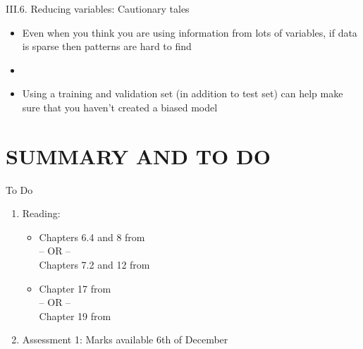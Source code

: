 \documentclass[handout]{beamer}
\begin{document}
\begin{frame}{III.6. Reducing variables: Cautionary tales}
\begin{itemize}
\item Even when you think you are using information from lots of variables, if data is sparse then patterns are hard to find
\item[]
\item Using a training and validation set (in addition to test set) can help make sure that you haven't created a biased model
\end{itemize}
\end{frame}



\section*{SUMMARY AND TO DO}
\begin{frame}{To Do}
\begin{enumerate}
\item Reading:
	\begin{itemize}
	\item Chapters 6.4 and 8 from \cite{WFH3:2011}\\  %
	-- OR --\\
	Chapters 7.2 and 12 from \cite{WFH4:2016}
	\item Chapter 17 from \cite{LB2:2004}\\
	-- OR -- \\
	Chapter 19 from \cite{LB3:2011} 
	\end{itemize}
\item Assessment 1: Marks available 6th of December
\end{enumerate}
\end{frame}
\end{document}
